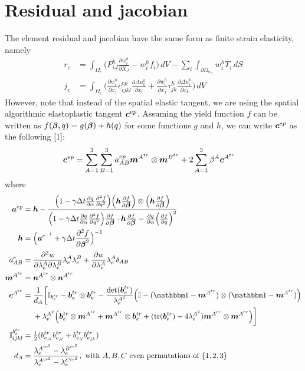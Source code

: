 \documentclass[10pt]{article}
\begin{document}
\section{Residual and jacobian}
The element residual and jacobian have the same form as finite strain elasticity, namely
\begin{align}
r_e &= \int_{\Omega_e} \Big(P^h_{iJ} \frac{\partial w^h_i}{\partial X_J} - w^h_i f_i \Big) \, dV
- \sum_i \int_{\partial \Omega_{e_{T_i}}} w^h_i T_i \, dS\\
j_e &=  \int_{\Omega_e} \Big( \frac{\partial w^h_i}{\partial x_j} c^{ep}_{ijkl} \frac{\partial \Delta u^h_k}{\partial x_l} 
+ \frac{\partial w^h_i}{\partial x_j} \tau^h_{jk} \frac{\partial \Delta u^h_i}{\partial x_k} \Big) \, dV
\end{align}
However, note that instead of the spatial elastic tangent, we are using the spatial algorithmic elastoplastic tangent $\mbox{\boldmath$ c$}^{ep}$. Assuming the yield function $f$ can be written as $f(\mbox{\boldmath$\beta$},q) = g(\mbox{\boldmath$\beta$}) + h(q)$ for some functions $g$ and $h$, we can write $\mbox{\boldmath$ c$}^{ep}$ as the following [1]:
\begin{align}
\mbox{\boldmath$ c$}^{ep} &= \sum_{A=1}^3 \sum_{B=1}^3 a^{ep}_{AB} \mbox{\boldmath$ m$}^{A^{tr}}\otimes\mbox{\boldmath$ m$}^{B^{tr}}
+
2\sum_{A=1}^3 \beta^A \mbox{\boldmath$ c$}^{A^{tr}}
\label{eqn:cep}
\end{align}
where
\begin{align}
\ba^{ep} &= \bh - \frac{\Big(1 - \gamma \Delta t \frac{\partial q}{\partial \alpha} \frac{\partial^2 f}{\partial q^2}\Big)
\Big(\bh \frac{\partial f}{\partial \Bbeta} \Big)\otimes\Big(\bh \frac{\partial f}{\partial \Bbeta} \Big)}
{\Big(1 - \gamma \Delta t \frac{\partial q}{\partial \alpha} \frac{\partial^2 f}{\partial q^2}\Big)
\frac{\partial f}{\partial \Bbeta}\cdot\bh \frac{\partial f}{\partial \Bbeta}
- \frac{\partial q}{\partial \alpha}\Big(\frac{\partial f}{\partial q}\Big)^2}\\
\bh &= \Big(\ba^{e^{-1}} + \gamma \Delta t \frac{\partial^2 f}{\partial \Bbeta^2}
\Big)^{-1}\\
a^e_{AB} &= \frac{\partial^2 w}{\partial \lambda^A_e \partial \lambda^B_e}
\lambda^A_e \lambda^B_e
+
\frac{\partial w}{\partial \lambda^A_e}
\lambda^A_e \delta_{AB}\\
\bm^{A^{tr}} &= \bn^{A^{tr}}\otimes\bn^{A^{tr}}\\
\bc^{A^{tr}} &=
\begin{aligned}[t]
&\frac{1}{d_A} \bigg[
\mathbb{I}_{b^{tr}_e} - \bb^{tr}_e \otimes \bb^{tr}_e - \frac{\det(\bb^{tr}_e)}{\lambda^{A^{2}}_e}
\Big(
\mathbb{I} - (\iso - \bm^{A^{tr}})\otimes(\iso - \bm^{A^{tr}})
\Big)\\
&+
\lambda^{A^{2}}_e
\Big(
\bb^{tr}_e \otimes\bm^{A^{tr}} + \bm^{A^{tr}} \otimes\bb^{tr}_e
+
(\tr(\bb^{tr}_e) - 4\lambda^{A^{2}}_e)\bm^{A^{tr}}\otimes\bm^{A^{tr}}
\Big)
\bigg]
\end{aligned}\\
\mathbb{I}^{b^{tr}_e}_{ijkl} &= \half(b^{tr}_{e_{ik}}b^{tr}_{e_{jl}} + b^{tr}_{e_{il}}b^{tr}_{e_{jk}})\\
d_A &= \frac{\lambda^{A^{tr^2}}_e - \lambda^{B^{tr^2}}_e}{\lambda^{A^{tr^2}}_e - \lambda^{C^{tr^2}}_e}, 
\text{ with $A,B,C$ even permutations of } \{1,2,3\}
\end{align}
\end{document}

